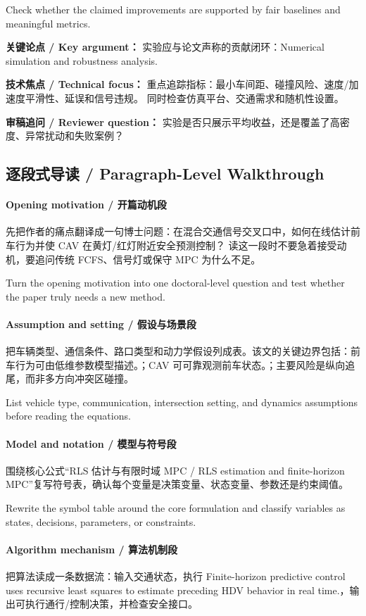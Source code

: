 \documentclass[UTF8,a4paper,11pt,fontset=fandol]{ctexart}
\begin{document}
Check whether the claimed improvements are supported by fair baselines and meaningful metrics.

\textbf{关键论点 / Key argument：} 实验应与论文声称的贡献闭环：Numerical simulation and robustness analysis.

\textbf{技术焦点 / Technical focus：} 重点追踪指标：最小车间距、碰撞风险、速度/加速度平滑性、延误和信号违规。 同时检查仿真平台、交通需求和随机性设置。

\textbf{审稿追问 / Reviewer question：} 实验是否只展示平均收益，还是覆盖了高密度、异常扰动和失败案例？


\subsection{逐段式导读 / Paragraph-Level Walkthrough}
\paragraph{Opening motivation / 开篇动机段}先把作者的痛点翻译成一句博士问题：在混合交通信号交叉口中，如何在线估计前车行为并使 CAV 在黄灯/红灯附近安全预测控制？ 读这一段时不要急着接受动机，要追问传统 FCFS、信号灯或保守 MPC 为什么不足。

Turn the opening motivation into one doctoral-level question and test whether the paper truly needs a new method.

\paragraph{Assumption and setting / 假设与场景段}把车辆类型、通信条件、路口类型和动力学假设列成表。该文的关键边界包括：前车行为可由低维参数模型描述。；CAV 可可靠观测前车状态。；主要风险是纵向追尾，而非多方向冲突区碰撞。

List vehicle type, communication, intersection setting, and dynamics assumptions before reading the equations.

\paragraph{Model and notation / 模型与符号段}围绕核心公式“RLS 估计与有限时域 MPC / RLS estimation and finite-horizon MPC”复写符号表，确认每个变量是决策变量、状态变量、参数还是约束阈值。

Rewrite the symbol table around the core formulation and classify variables as states, decisions, parameters, or constraints.

\paragraph{Algorithm mechanism / 算法机制段}把算法读成一条数据流：输入交通状态，执行 Finite-horizon predictive control uses recursive least squares to estimate preceding HDV behavior in real time.，输出可执行通行/控制决策，并检查安全接口。
\end{document}
